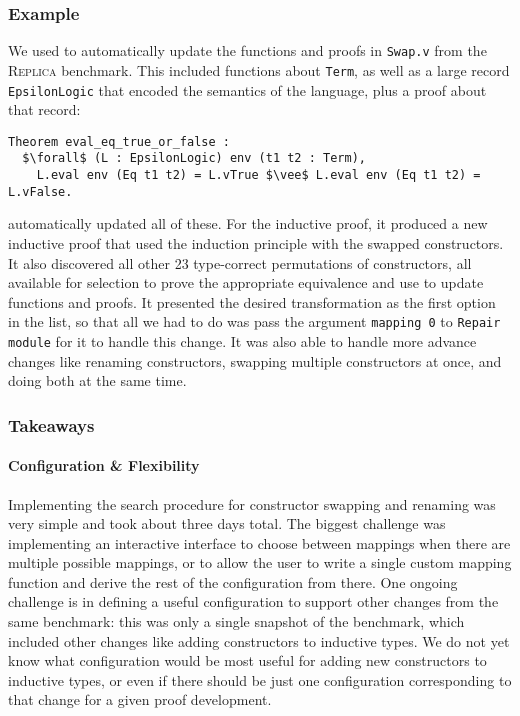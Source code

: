 \subsubsection{Example}

We used \toolname to automatically update the functions and proofs in \lstinline{Swap.v} from the \textsc{Replica} benchmark.
This included functions about \lstinline{Term}, as well as a large record \lstinline{EpsilonLogic} that encoded the semantics of the language,
plus a proof about that record:

\begin{lstlisting}
Theorem eval_eq_true_or_false :
  $\forall$ (L : EpsilonLogic) env (t1 t2 : Term),
    L.eval env (Eq t1 t2) = L.vTrue $\vee$ L.eval env (Eq t1 t2) = L.vFalse.
\end{lstlisting}
\toolname automatically updated all of these. For the inductive proof, it produced
a new inductive proof that used the induction principle with the swapped constructors.
It also discovered all other 23 type-correct permutations of constructors, all available for selection to 
prove the appropriate equivalence and use to update functions and proofs.
It presented the desired transformation as the first option in the list, so that all we had to do
was pass the argument \lstinline{mapping 0} to \lstinline{Repair module} for it to handle this change.
It was also able to handle more advance changes like renaming constructors, swapping multiple constructors at once,
and doing both at the same time.

\subsubsection{Takeaways}

\paragraph{Configuration \& Flexibility}
Implementing the search procedure for constructor swapping and renaming was very simple and took about three days total.
The biggest challenge was implementing an interactive interface to choose between mappings when there are multiple possible mappings,
or to allow the user to write a single custom mapping function and derive the rest of the configuration from there.
One ongoing challenge is in defining a useful configuration to support other changes from the same benchmark:
this was only a single snapshot of the benchmark, which included
other changes like adding constructors to inductive types.
We do not yet know what configuration would be most useful for adding new constructors to inductive types,
or even if there should be just one configuration corresponding to that change for a given proof development.

